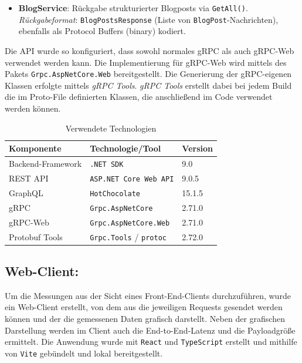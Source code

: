 \begin{enumerate}
\begin{itemize}
		\item \textbf{BlogService}: Rückgabe strukturierter Blogposts via \texttt{GetAll()}.\\
		\emph{Rückgabeformat}: \texttt{BlogPostsResponse} (Liste von \texttt{BlogPost}-Nachrichten), ebenfalls als Protocol Buffers (binary) kodiert.
	\end{itemize}
	
	Die API wurde so konfiguriert, dass sowohl normales gRPC als auch gRPC-Web verwendet werden kann. Die Implementierung für gRPC-Web wird mittels des Pakets \texttt{Grpc.AspNetCore.Web} bereitgestellt. Die Generierung der gRPC-eigenen Klassen erfolgte mittels \emph{gRPC Tools}. \emph{gRPC Tools} erstellt dabei bei jedem Build die im Proto-File definierten Klassen, die anschließend im Code verwendet werden können.
	
	\begin{table}[h]
		\centering
		\caption{Verwendete Technologien}
		\begin{tabular}{lll}
			\hline
			\textbf{Komponente} & \textbf{Technologie/Tool} & \textbf{Version} \\
			\hline
			Backend-Framework & \texttt{.NET~SDK} & 9.0 \\
			REST API & \texttt{ASP.NET~Core~Web~API} & 9.0.5 \\
			GraphQL & \texttt{HotChocolate} & 15.1.5 \\
			gRPC & \texttt{Grpc.AspNetCore} & 2.71.0 \\
			gRPC-Web & \texttt{Grpc.AspNetCore.Web} & 2.71.0 \\
			Protobuf Tools & \texttt{Grpc.Tools} / \texttt{protoc} & 2.72.0 \\
			\hline
		\end{tabular}
	\end{table}
	
	\subsection{Web-Client:}
	Um die Messungen aus der Sicht eines Front-End-Clients durchzuführen, wurde ein Web-Client erstellt, von dem aus die jeweiligen Requests gesendet werden können und der die gemessenen Daten grafisch darstellt. Neben der grafischen Darstellung werden im Client auch die End-to-End-Latenz und die Payloadgröße ermittelt. Die Anwendung wurde mit \texttt{React} und \texttt{TypeScript} erstellt und mithilfe von \texttt{Vite} gebündelt und lokal bereitgestellt.
	

\end{enumerate}
